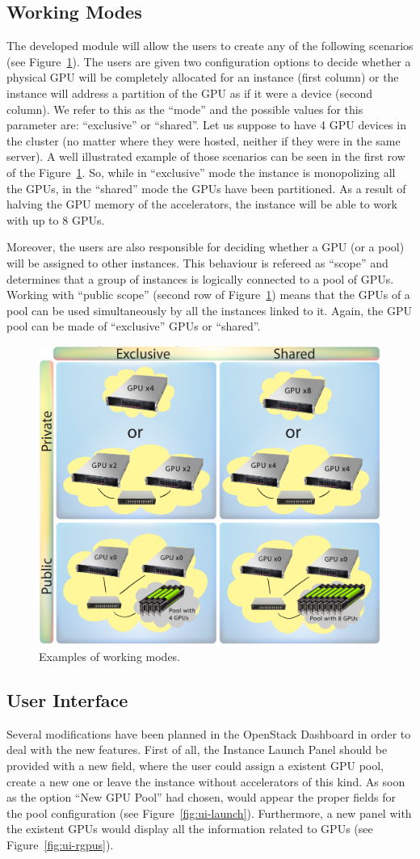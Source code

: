 \documentclass[a4paper,twoside]{article}
\begin{document}
\subsection{Working Modes}
The developed module will allow the users to create any of the following scenarios (see Figure~\ref{fig2}). 
The users are given two configuration options to decide whether a physical GPU will be completely allocated for an instance (first column) or the instance will address a partition of the GPU as if it were a device (second column).
We refer to this as the ``mode'' and the possible values for this parameter are: ``exclusive'' or ``shared''. 
Let us suppose to have 4 GPU devices in the cluster (no matter where they were hosted, neither if they were in the same server). 
A well illustrated example of those scenarios can be seen in the first row of the  Figure~\ref{fig2}.
So, while in ``exclusive'' mode the instance is monopolizing all the GPUs, in the ``shared'' mode the GPUs have been partitioned. 
As a result of halving the GPU memory of the accelerators, the instance will be able to work with up to 8 GPUs.

Moreover, the users are also responsible for deciding whether a GPU (or a pool) will be assigned to other instances. 
This behaviour is refereed as ``scope'' and determines that a group of instances is logically connected to a pool of GPUs.
Working with ``public scope'' (second row of Figure~\ref{fig2}) means that the GPUs of a pool can be used simultaneously by all the instances linked to it.
Again, the GPU pool can be made of ``exclusive'' GPUs or ``shared''.

\begin{figure}[htb]
  \centering
  \includegraphics[width=.5\textwidth]{images/workingmodes.jpg}
  \caption{Examples of working modes.}
  \label{fig2}
\end{figure}

\subsection{User Interface}
Several modifications have been planned in the OpenStack Dashboard in order to deal with the new features.
First of all, the Instance Launch Panel should be provided with a new field, where the user could assign a existent GPU pool, create a new one or leave the instance without accelerators of this kind.
As soon as the option ``New GPU Pool'' had chosen, would appear the proper fields for the pool configuration (see Figure~\ref{fig:ui-launch}).
Furthermore, a new panel with the existent GPUs would display all the information related to GPUs (see Figure~\ref{fig:ui-rgpus}).
\end{document}
